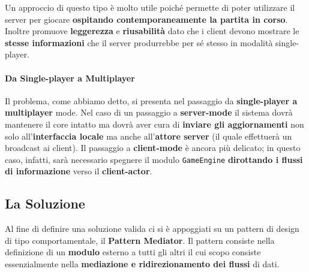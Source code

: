 Un approccio di questo tipo è molto utile poiché permette di poter utilizzare il server per giocare \textbf{ospitando contemporaneamente la partita in corso}. Inoltre promuove \textbf{leggerezza} e \textbf{riusabilità} dato che i client devono mostrare le \textbf{stesse informazioni} che il server produrrebbe per sé stesso in modalità single-player.

\paragraph{Da Single-player a Multiplayer}
Il problema, come abbiamo detto, si presenta nel passaggio da \textbf{single-player a multiplayer} mode. Nel caso di un passaggio a \textbf{server-mode} il sistema dovrà mantenere il core intatto ma dovrà aver cura di \textbf{inviare gli aggiornamenti} non solo all'\textbf{interfaccia locale} ma anche all'\textbf{attore server} (il quale effettuerà un broadcast ai client). Il passaggio a \textbf{client-mode} è ancora più delicato; in questo caso, infatti, sarà necessario spegnere il modulo \texttt{GameEngine} \textbf{dirottando i flussi di informazione} verso il \textbf{client-actor}.

\subsection{La Soluzione}
\label{subsec:mediator_solution}
Al fine di definire una soluzione valida ci si è appoggiati su un pattern di design di tipo comportamentale, il \textbf{Pattern Mediator}. Il pattern consiste nella definizione di un \textbf{modulo} esterno a tutti gli altri il cui scopo consiste essenzialmente nella \textbf{mediazione e ridirezionamento dei flussi} di dati.

